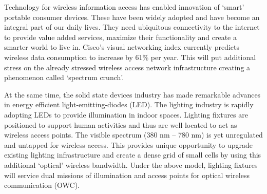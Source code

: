 
Technology for wireless information access has enabled innovation of `smart' portable consumer devices. These have been widely adopted and have become an integral part of our daily lives. They need ubiquitous connectivity to the internet to provide value added services, maximize their functionality and create a smarter world to live in. Cisco's visual networking index currently predicts wireless data consumption to increase by 61\% per year. This will put additional stress on the already stressed wireless access network infrastructure creating a phenomenon called `spectrum crunch'.

At the same time, the solid state devices industry has made remarkable advances in energy efficient light-emitting-diodes (LED). The lighting industry is rapidly adopting LEDs to provide illumination in indoor spaces. Lighting fixtures are positioned to support human activities and thus are well located to act as wireless access points. The visible spectrum (380 nm -- 780 nm) is yet unregulated and untapped for wireless access. This provides unique opportunity to upgrade existing lighting infrastructure and create a dense grid of small cells by using this additional `optical' wireless bandwidth. Under the above model, lighting fixtures will service dual missions of illumination and access points for optical wireless communication (OWC).

